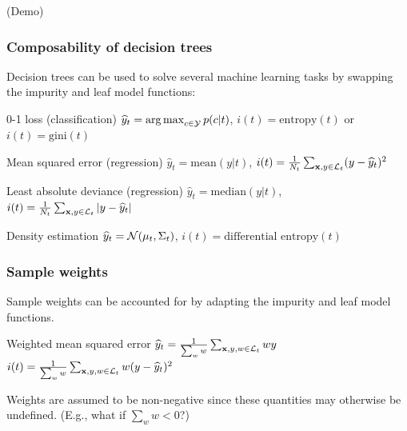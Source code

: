 \documentclass{beamer}
\DeclareMathOperator*{\argmax}{arg\,max}
\begin{document}
\begin{frame}
    \begin{center}
        (Demo)
    \end{center}

\end{frame}

\begin{frame}
    \frametitle{Composability of decision trees}

    Decision trees can be used to solve several machine learning tasks by
    swapping the impurity and leaf model functions:

    \vspace{0.5cm}

    \begin{block}{0-1 loss (classification)}
    $\widehat{y}_t = \argmax_{c \in {\cal Y}} p(c|t)$, $i(t) = \text{entropy}(t)$ or $i(t) = \text{gini}(t)$
    \end{block}

    \begin{block}{Mean squared error (regression)}
    $\widehat{y}_t = \text{mean}(y|t)$, $i(t) = \frac{1}{N_t} \sum_{\mathbf{x}, y \in {\cal L}_t} (y - \widehat{y}_t)^2$
    \end{block}

    \begin{block}{Least absolute deviance (regression)}
    $\widehat{y}_t = \text{median}(y|t)$, $i(t) = \frac{1}{N_t} \sum_{\mathbf{x}, y \in {\cal L}_t} |y - \widehat{y}_t|$
    \end{block}

    \begin{block}{Density estimation}
    $\widehat{y}_t = {\cal N}(\mu_t, \Sigma_t)$, $i(t) = \text{differential entropy}(t)$
    \end{block}
\end{frame}

\begin{frame}
    \frametitle{Sample weights}

    Sample weights can be accounted for by adapting the impurity and leaf model functions.

    \vspace{0.5cm}

    \begin{block}{Weighted mean squared error}
    $\widehat{y}_t = \frac{1}{\sum_{w} w} \sum_{\mathbf{x}, y, w \in {\cal L}_t} w y$\\
    $i(t) = \frac{1}{\sum_{w} w}  \sum_{\mathbf{x}, y, w \in {\cal L}_t} w (y - \widehat{y}_t)^2$
    \end{block}

    \vspace{0.5cm}

    Weights are assumed to be {\color{red}non-negative} since these quantities may otherwise be undefined. (E.g., what if $\sum_{w} w < 0$?)


\end{frame}
\end{document}

